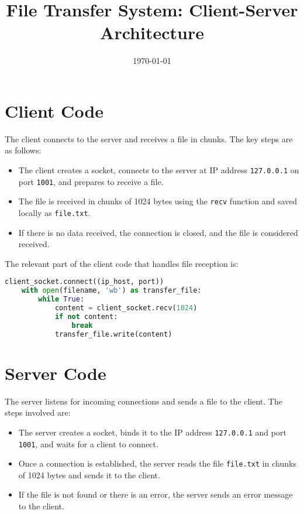 \documentclass{article}
\title{File Transfer System: Client-Server Architecture}
\author{}
\date{\today}
\begin{document}
\maketitle

\section{Client Code}
The client connects to the server and receives a file in chunks. The key steps are as follows:

\begin{itemize}
    \item The client creates a socket, connects to the server at IP address \texttt{127.0.0.1} on port \texttt{1001}, and prepares to receive a file.
    \item The file is received in chunks of 1024 bytes using the \texttt{recv} function and saved locally as \texttt{file.txt}.
    \item If there is no data received, the connection is closed, and the file is considered received.
\end{itemize}

The relevant part of the client code that handles file reception is:

\begin{lstlisting}[language=Python]
    client_socket.connect((ip_host, port))
    with open(filename, 'wb') as transfer_file:
        while True:
            content = client_socket.recv(1024)
            if not content:
                break  
            transfer_file.write(content)  
\end{lstlisting}

\section{Server Code}
The server listens for incoming connections and sends a file to the client. The steps involved are:

\begin{itemize}
    \item The server creates a socket, binds it to the IP address \texttt{127.0.0.1} and port \texttt{1001}, and waits for a client to connect.
    \item Once a connection is established, the server reads the file \texttt{file.txt} in chunks of 1024 bytes and sends it to the client.
    \item If the file is not found or there is an error, the server sends an error message to the client.
\end{itemize}
\end{document}
